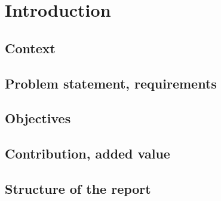 \chapter{Introduction}

\section{Context}

\section{Problem statement, requirements}

\section{Objectives}

\section{Contribution, added value}

\section{Structure of the report}


